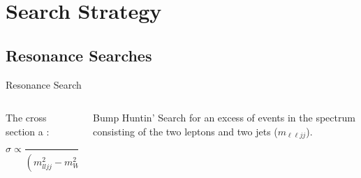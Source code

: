 \documentclass[aspectratio=169]{beamer}
\newcommand{\ssection}[1]{%
  \section{#1}%
  \sectionframe{#1}%
}%
\begin{document}
\section{Search Strategy} %

\subsection{Resonance Searches}

\begin{frame}{Resonance Search}
  \begin{columns}
    \begin{column}{0.4\textwidth}
      \vfill
      {The cross section a :
      $$
        \sigma \propto \frac{1}{\left(m_{lljj}^{2} - m_{W_R}^{2}\right)^{2} + \Gamma^{2} m^{2}_{W_R}}
      $$}
      \begin{figure}
        \centering
        
      \end{figure}
    \end{column}
    \begin{column}{0.59\textwidth}
      \begin{block}{Bump Huntin'}
        Search for an excess of events in the  
        spectrum consisting of the two leptons and two jets ($m_{\ell \ell j j}$).
      \end{block}
      \begin{figure}
        \centering
        \resizebox{0.9\linewidth}{!}{%
      }
      \end{figure}
    \end{column}
  \end{columns}
\end{frame}
\end{document}
